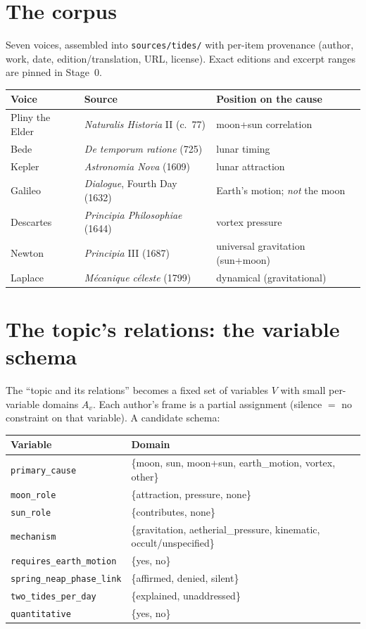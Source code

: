 \documentclass[11pt]{article}
\newcommand{\lean}[1]{\texttt{#1}}
\begin{document}
\section{The corpus}

Seven voices, assembled into \lean{sources/tides/} with per-item
provenance (author, work, date, edition/translation, URL, license).
Exact editions and excerpt ranges are pinned in Stage~0.

\begin{center}
\begin{tabular}{@{}lll@{}}
\toprule
Voice & Source & Position on the cause \\
\midrule
Pliny the Elder & \emph{Naturalis Historia} II (c.~77) & moon+sun correlation \\
Bede & \emph{De temporum ratione} (725) & lunar timing \\
Kepler & \emph{Astronomia Nova} (1609) & lunar attraction \\
Galileo & \emph{Dialogue}, Fourth Day (1632) & Earth's motion; \emph{not} the moon \\
Descartes & \emph{Principia Philosophiae} (1644) & vortex pressure \\
Newton & \emph{Principia} III (1687) & universal gravitation (sun+moon) \\
Laplace & \emph{M\'ecanique c\'eleste} (1799) & dynamical (gravitational) \\
\bottomrule
\end{tabular}
\end{center}

\section{The topic's relations: the variable schema}

The ``topic and its relations'' becomes a fixed set of variables $V$ with
small per-variable domains $A_v$. Each author's frame is a partial
assignment (silence $=$ no constraint on that variable). A candidate
schema:

\begin{center}
\begin{tabular}{@{}ll@{}}
\toprule
Variable & Domain \\
\midrule
\lean{primary\_cause} & \{moon, sun, moon+sun, earth\_motion, vortex, other\} \\
\lean{moon\_role} & \{attraction, pressure, none\} \\
\lean{sun\_role} & \{contributes, none\} \\
\lean{mechanism} & \{gravitation, aetherial\_pressure, kinematic, occult/unspecified\} \\
\lean{requires\_earth\_motion} & \{yes, no\} \\
\lean{spring\_neap\_phase\_link} & \{affirmed, denied, silent\} \\
\lean{two\_tides\_per\_day} & \{explained, unaddressed\} \\
\lean{quantitative} & \{yes, no\} \\
\bottomrule
\end{tabular}
\end{center}
\end{document}
